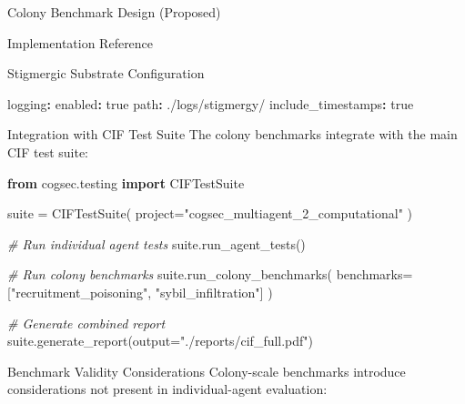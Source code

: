 \documentclass[
  ignorenonframetext,
]{beamer}
\newenvironment{Shaded}{}{}
\newcommand{\AttributeTok}[1]{\textcolor[rgb]{0.49,0.56,0.16}{#1}}
\newcommand{\CharTok}[1]{\textcolor[rgb]{0.25,0.44,0.63}{#1}}
\newcommand{\CommentTok}[1]{\textcolor[rgb]{0.38,0.63,0.69}{\textit{#1}}}
\newcommand{\FunctionTok}[1]{\textcolor[rgb]{0.02,0.16,0.49}{#1}}
\newcommand{\ImportTok}[1]{\textcolor[rgb]{0.00,0.50,0.00}{\textbf{#1}}}
\newcommand{\KeywordTok}[1]{\textcolor[rgb]{0.00,0.44,0.13}{\textbf{#1}}}
\newcommand{\NormalTok}[1]{#1}
\newcommand{\OperatorTok}[1]{\textcolor[rgb]{0.40,0.40,0.40}{#1}}
\newcommand{\StringTok}[1]{\textcolor[rgb]{0.25,0.44,0.63}{#1}}
\begin{document}
\begin{frame}[fragile]{Colony Benchmark Design (Proposed)}
\begin{block}{Implementation Reference}
\begin{block}{Stigmergic Substrate Configuration}
\begin{Shaded}
\begin{Highlighting}[]
\AttributeTok{  }\FunctionTok{logging}\KeywordTok{:}
\AttributeTok{    }\FunctionTok{enabled}\KeywordTok{:}\AttributeTok{ }\CharTok{true}
\AttributeTok{    }\FunctionTok{path}\KeywordTok{:}\AttributeTok{ ./logs/stigmergy/}
\AttributeTok{    }\FunctionTok{include\_timestamps}\KeywordTok{:}\AttributeTok{ }\CharTok{true}
\end{Highlighting}
\end{Shaded}
\end{block}
\end{block}

\begin{block}{Integration with CIF Test Suite}
\protect{}\label{integration-with-cif-test-suite}
The colony benchmarks integrate with the main CIF test suite:

\begin{Shaded}
\begin{Highlighting}[]
\ImportTok{from}\NormalTok{ cogsec.testing }\ImportTok{import}\NormalTok{ CIFTestSuite}

\NormalTok{suite }\OperatorTok{=}\NormalTok{ CIFTestSuite(}
\NormalTok{    project}\OperatorTok{=}\StringTok{"cogsec\_multiagent\_2\_computational"}
\NormalTok{)}

\CommentTok{\# Run individual agent tests}
\NormalTok{suite.run\_agent\_tests()}

\CommentTok{\# Run colony benchmarks}
\NormalTok{suite.run\_colony\_benchmarks(}
\NormalTok{    benchmarks}\OperatorTok{=}\NormalTok{[}\StringTok{"recruitment\_poisoning"}\NormalTok{, }\StringTok{"sybil\_infiltration"}\NormalTok{]}
\NormalTok{)}

\CommentTok{\# Generate combined report}
\NormalTok{suite.generate\_report(output}\OperatorTok{=}\StringTok{"./reports/cif\_full.pdf"}\NormalTok{)}
\end{Highlighting}
\end{Shaded}
\end{block}

\begin{block}{Benchmark Validity Considerations}
\protect{}\label{sec:benchmark-validity}
Colony-scale benchmarks introduce considerations not present in
individual-agent evaluation:


\end{block}
\end{frame}
\end{document}
